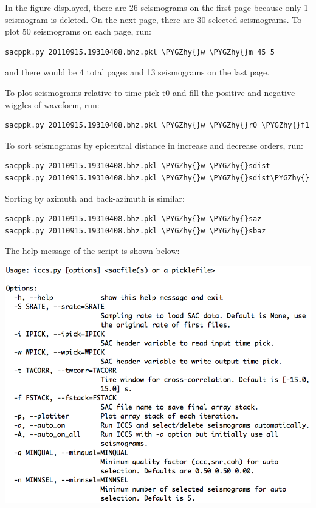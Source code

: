 \documentclass[letterpaper,10pt,english]{sphinxmanual}
\def\PYGZhy{\char`\-}
\begin{document}
In the figure displayed, there are 26 seismograms on the first page because only 1 seismogram is deleted. On the next page, there are 30 selected seismograms. To plot 50 seismograms on each page, run:

\begin{Verbatim}[commandchars=\\\{\}]
sacppk.py 20110915.19310408.bhz.pkl \PYGZhy{}w \PYGZhy{}m 45 5
\end{Verbatim}

and there would be 4 total pages and 13 seismograms on the last page.

To plot seismograms relative to time pick t0 and fill the positive and negative wiggles of waveform, run:

\begin{Verbatim}[commandchars=\\\{\}]
sacppk.py 20110915.19310408.bhz.pkl \PYGZhy{}w \PYGZhy{}r0 \PYGZhy{}f1
\end{Verbatim}

To sort seismograms by epicentral distance in increase and decrease orders, run:

\begin{Verbatim}[commandchars=\\\{\}]
sacppk.py 20110915.19310408.bhz.pkl \PYGZhy{}w \PYGZhy{}sdist
sacppk.py 20110915.19310408.bhz.pkl \PYGZhy{}w \PYGZhy{}sdist\PYGZhy{}
\end{Verbatim}

Sorting by azimuth and back-azimuth is similar:

\begin{Verbatim}[commandchars=\\\{\}]
sacppk.py 20110915.19310408.bhz.pkl \PYGZhy{}w \PYGZhy{}saz
sacppk.py 20110915.19310408.bhz.pkl \PYGZhy{}w \PYGZhy{}sbaz
\end{Verbatim}

The help message of the  script is shown below:

\includegraphics{help-iccs.png}
\end{document}
